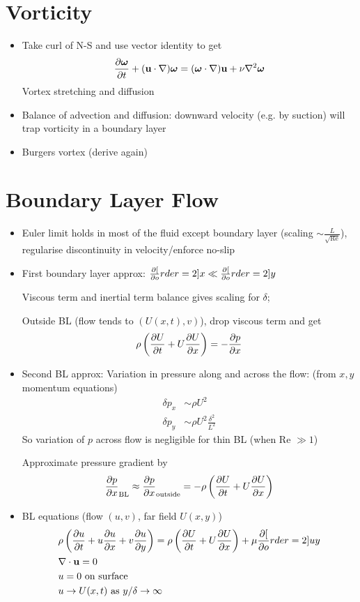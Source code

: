 \section{Vorticity}
\begin{itemize}
    \item Take curl of N-S and use vector identity to get \[\frac{\partial{\boldsymbol{\mathbf{\omega}}}}{\partial{t}} + (\boldsymbol{\mathbf{u}}\cdot \nabla)\boldsymbol{\mathbf{\omega}} = (\boldsymbol{\mathbf{\omega}}\cdot \nabla)\boldsymbol{\mathbf{u}} + \nu \nabla^2 \boldsymbol{\mathbf{\omega}}\]
    Vortex stretching and diffusion
    \item Balance of advection and diffusion: downward velocity (e.g. by suction) will trap vorticity in a boundary layer
    \item Burgers vortex (derive again)
\end{itemize}
\section{Boundary Layer Flow}
\begin{itemize}
    \item Euler limit holds in most of the fluid except boundary layer (scaling $\sim \frac{L}{\sqrt{\text{Re}}}$), regularise discontinuity in velocity/enforce no-slip
    \item First boundary layer approx: $\frac{\partial{[}}{\partial{o}}rder=2]{}{x} \ll \frac{\partial{[}}{\partial{o}}rder=2]{}{y}$
    
    Viscous term and inertial term balance gives scaling for $\delta$; 
    
    Outside BL (flow tends to $(U(x,t),v)$), drop viscous term and get 
    \[\rho \left( \frac{\partial{U}}{\partial{t}} + U \frac{\partial{U}}{\partial{x}}\right) = -\frac{\partial{p}}{\partial{x}}\]

    \item Second BL approx: Variation in pressure along and across the flow: (from $x,y$ momentum equations)
    \begin{align*}
        \delta p_x &\sim \rho U^2 \\
        \delta p_y &\sim \rho U^2 \frac{\delta^2}{L^2}
    \end{align*} 
    So variation of $p$ across flow is negligible for thin BL (when Re $\gg 1$)
    
    Approximate pressure gradient by
    \[\frac{\partial{p}}{\partial{x}}_{\text{BL}} \approx \frac{\partial{p}}{\partial{x}}_{\text{outside}} = - \rho \left( \frac{\partial{U}}{\partial{t}} + U \frac{\partial{U}}{\partial{x}}\right)\]

    \item BL equations (flow $(u,v)$, far field $U(x,y)$)    
    \begin{align*}
        &\rho \left( \frac{\partial{u}}{\partial{t}} + u \frac{\partial{u}}{\partial{x}} + v \frac{\partial{u}}{\partial{y}}\right) = \rho \left( \frac{\partial{U}}{\partial{t}} + U \frac{\partial{U}}{\partial{x}}\right) + \mu \frac{\partial{[}}{\partial{o}}rder=2]{u}{y} \\
        &\nabla\cdot\boldsymbol{\mathbf{u}} = 0 \\
        &u = 0 \text{ on surface} \\
        &u \to U(x,t) \text{ as } y/\delta \to \infty
    \end{align*}
\end{itemize}

